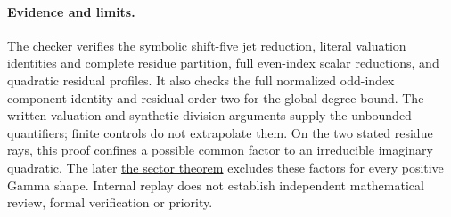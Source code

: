 \documentclass[11pt]{article}
\begin{document}
\paragraph{Evidence and limits.}
The checker verifies the symbolic shift-five jet reduction, literal
valuation identities and complete residue partition, full even-index
scalar reductions, and quadratic residual profiles.
It also checks the full normalized odd-index component identity and
residual order two for the global degree bound.
The written valuation and synthetic-division arguments supply the
unbounded quantifiers; finite controls do not extrapolate them.
On the two stated residue rays, this proof confines a possible common
factor to an irreducible imaginary quadratic. The later \href{LOWER_FIVE_QUADRATIC_SECTOR_SFC.tex}{the sector theorem}
excludes these factors for every positive Gamma shape.
Internal replay does not establish independent mathematical review,
formal verification or priority.
\end{document}
